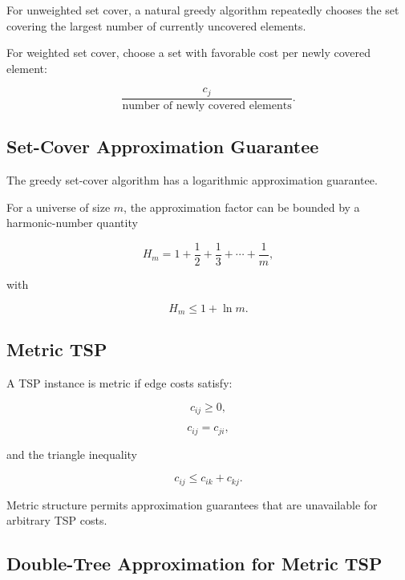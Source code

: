For unweighted set cover, a natural greedy algorithm repeatedly chooses
the set covering the largest number of currently uncovered elements.

For weighted set cover, choose a set with favorable cost per newly covered
element:

\[
\boxed{
\frac{
c_j
}{
\text{number of newly covered elements}
}.
}
\]

\subsection{Set-Cover Approximation Guarantee}
\label{subsec:set-cover-approximation}

The greedy set-cover algorithm has a logarithmic approximation guarantee.

For a universe of size \(m\), the approximation factor can be bounded by a
harmonic-number quantity

\[
\boxed{
H_m
=
1+\frac12+\frac13+\cdots+\frac1m,
}
\]

with

\[
\boxed{
H_m
\leq
1+\ln m.
}
\]

\subsection{Metric TSP}
\label{subsec:metric-tsp}

A TSP instance is metric if edge costs satisfy:

\[
\boxed{
c_{ij}\geq0,
}
\]

\[
\boxed{
c_{ij}=c_{ji},
}
\]

and the triangle inequality

\[
\boxed{
c_{ij}
\leq
c_{ik}+c_{kj}.
}
\]

Metric structure permits approximation guarantees that are unavailable
for arbitrary TSP costs.

\subsection{Double-Tree Approximation for Metric TSP}
\label{subsec:double-tree-tsp}

